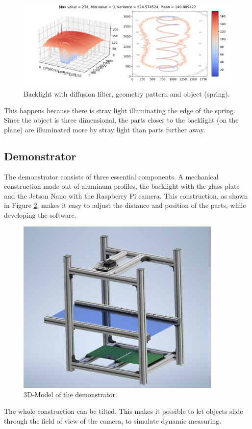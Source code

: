 \begin{figure}[ht]
	\centering
	\includegraphics[trim=50 0 0 0,clip,width=0.9\linewidth]{3-development/backlight/3d4.png}
	\caption{Backlight with diffusion filter, geometry pattern and object (spring).\label{development:3d4}}
\end{figure} 
This happens because there is stray light illuminating the edge of the spring.
Since the object is three dimensional, the parts closer to the backlight (on the plane) are illuminated more by stray light than parts further away.

\newpage
\subsection{Demonstrator}
The demonstrator consists of three essential components.
A mechanical construction made out of aluminum profiles, the backlight with the glass plate and the Jetson Nano with the Raspberry Pi camera.  
This construction, as shown in Figure \ref{development:demo}, makes it easy to adjust the distance and position of the parts, while developing the software.
\begin{figure}[ht]
	\centering
	\includegraphics[width=0.9\textwidth]{3-development/images/Demonstrator.png}
	\caption{3D-Model of the demonstrator.\label{development:demo}}
\end{figure} 
The whole construction can be tilted.
This makes it possible to let objects slide through the field of view of the camera, to simulate dynamic measuring.

